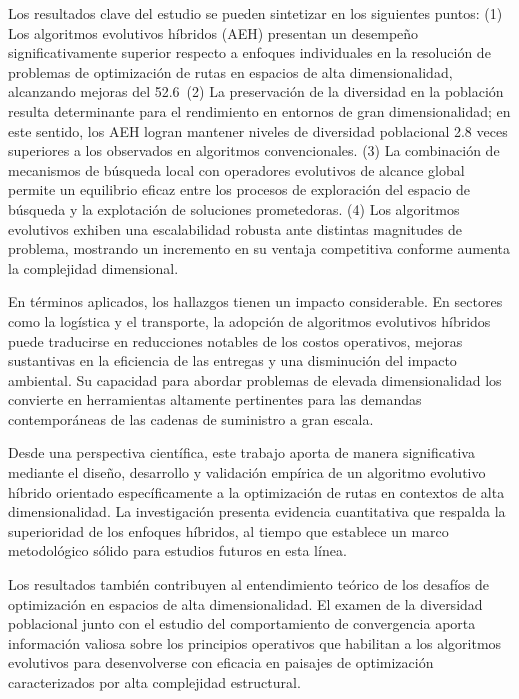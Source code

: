 \documentclass[conference]{IEEEtran}
\begin{document}
Los resultados clave del estudio se pueden sintetizar en los siguientes puntos:
(1) Los algoritmos evolutivos híbridos (AEH) presentan un desempeño significativamente superior respecto a enfoques individuales en la resolución de problemas de optimización de rutas en espacios de alta dimensionalidad, alcanzando mejoras del 52.6 %
(2) La preservación de la diversidad en la población resulta determinante para el rendimiento en entornos de gran dimensionalidad; en este sentido, los AEH logran mantener niveles de diversidad poblacional 2.8 veces superiores a los observados en algoritmos convencionales.
(3) La combinación de mecanismos de búsqueda local con operadores evolutivos de alcance global permite un equilibrio eficaz entre los procesos de exploración del espacio de búsqueda y la explotación de soluciones prometedoras.
(4) Los algoritmos evolutivos exhiben una escalabilidad robusta ante distintas magnitudes de problema, mostrando un incremento en su ventaja competitiva conforme aumenta la complejidad dimensional.

En términos aplicados, los hallazgos tienen un impacto considerable. En sectores como la logística y el transporte, la adopción de algoritmos evolutivos híbridos puede traducirse en reducciones notables de los costos operativos, mejoras sustantivas en la eficiencia de las entregas y una disminución del impacto ambiental. Su capacidad para abordar problemas de elevada dimensionalidad los convierte en herramientas altamente pertinentes para las demandas contemporáneas de las cadenas de suministro a gran escala.

Desde una perspectiva científica, este trabajo aporta de manera significativa mediante el diseño, desarrollo y validación empírica de un algoritmo evolutivo híbrido orientado específicamente a la optimización de rutas en contextos de alta dimensionalidad. La investigación presenta evidencia cuantitativa que respalda la superioridad de los enfoques híbridos, al tiempo que establece un marco metodológico sólido para estudios futuros en esta línea.

Los resultados también contribuyen al entendimiento teórico de los desafíos de optimización en espacios de alta dimensionalidad. El examen de la diversidad poblacional junto con el estudio del comportamiento de convergencia aporta información valiosa sobre los principios operativos que habilitan a los algoritmos evolutivos para desenvolverse con eficacia en paisajes de optimización caracterizados por alta complejidad estructural.
\end{document}
